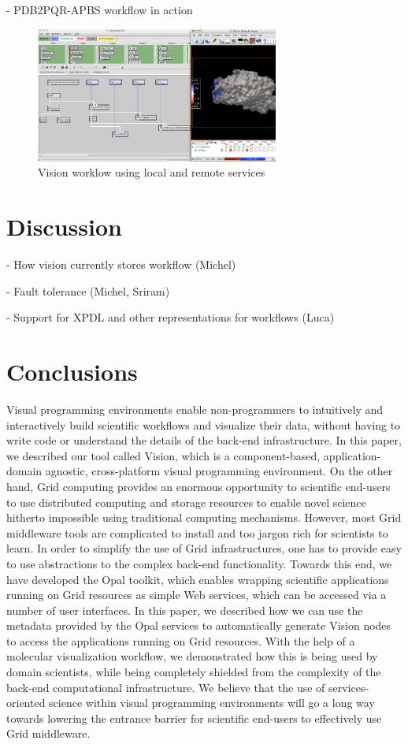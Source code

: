 \documentclass[conference]{IEEEtran}
\begin{document}
- PDB2PQR-APBS workflow in action

\begin{figure}
\begin{center}
\includegraphics[width=8cm]{vision-workflow}
\end{center}
\caption{Vision worklow using local and remote services}
\label{fig:vision-workflow}
\end{figure}

\section {Discussion}

- How vision currently stores workflow (Michel)

- Fault tolerance (Michel, Sriram)

- Support for XPDL and other representations for workflows (Luca)

\section {Conclusions}

Visual programming environments enable non-programmers to intuitively and
interactively build scientific workflows and visualize their data, without
having to write code or understand the details of the back-end
infrastructure. In this paper, we described our tool called Vision, which
is a component-based, application-domain agnostic, cross-platform visual
programming environment. On the other hand, Grid computing provides an
enormous opportunity to scientific end-users to use distributed computing
and storage resources to enable novel science hitherto impossible using
traditional computing mechanisms. However, most Grid middleware tools are
complicated to install and too jargon rich for scientists to learn. In
order to simplify the use of Grid infrastructures, one has to provide easy
to use abstractions to the complex back-end functionality. Towards this
end, we have developed the Opal toolkit, which enables wrapping scientific
applications running on Grid resources as simple Web services, which can be
accessed via a number of user interfaces. In this paper, we described how
we can use the metadata provided by the Opal services to automatically
generate Vision nodes to access the applications running on Grid resources.
With the help of a molecular visualization workflow, we demonstrated how
this is being used by domain scientists, while being completely shielded
from the complexity of the back-end computational infrastructure. We
believe that the use of services-oriented science within visual programming
environments will go a long way towards lowering the entrance barrier for
scientific end-users to effectively use Grid middleware.
\end{document}
